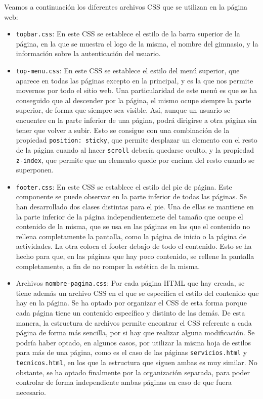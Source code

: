 \documentclass[11pt]{article}
\theoremstyle{plain}
\theoremstyle{definition}
\begin{document}
Veamos a continuación los diferentes archivos CSS que se utilizan en
la página web:

\begin{itemize}
\item \texttt{topbar.css}: En este CSS se establece el estilo de la
  barra superior de la página, en la que se muestra el logo de la
  misma, el nombre del gimnasio, y la información sobre la
  autenticación del usuario.
\item \texttt{top-menu.css}: En este CSS se establece el estilo del
  menú superior, que aparece en todas las páginas excepto en la
  principal, y es la que nos permite movernos por todo el sitio
  web. Una particularidad de este menú es que se ha conseguido que al
  descender por la página, el mismo ocupe siempre la parte superior,
  de forma que siempre sea visible.  Así, aunque un usuario se
  encuentre en la parte inferior de una página, podrá dirigirse a otra
  página sin tener que volver a subir. Esto se consigue con una
  combinación de la propiedad \texttt{position: sticky}, que permite
  desplazar un elemento con el resto de la página cuando al hacer
  \texttt{scroll} debería quedarse oculto, y la propiedad
  \texttt{z-index}, que permite que un elemento quede por encima del
  resto cuando se superponen.
\item \texttt{footer.css}: En este CSS se establece el estilo del pie
  de página. Este componente se puede observar en la parte inferior de
  todas las páginas. Se han desarrollado dos clases distintas para el
  pie. Una de ellas se mantiene en la parte inferior de la página
  independientemete del tamaño que ocupe el contenido de la misma, que
  se usa en las páginas en las que el contenido no rellena
  completamente la pantalla, como la página de inicio o la página de
  actividades. La otra coloca el footer debajo de todo el
  contenido. Esto se ha hecho para que, en las páginas que hay poco
  contenido, se rellene la pantalla completamente, a fin de no romper
  la estética de la misma.
\item Archivos \texttt{nombre-pagina.css}: Por cada página HTML que
  hay creada, se tiene además un archivo CSS en el que se especifica
  el estilo del contenido que hay en la página. Se ha optado por
  organizar el CSS de esta forma porque cada página tiene un contenido
  específico y distinto de las demás. De esta manera, la estructura de
  archivos permite encontrar el CSS referente a cada página de forma
  más sencilla, por si hay que realizar alguna modificación. Se podría
  haber optado, en algunos casos, por utilizar la misma hoja de
  estilos para más de una página, como es el caso de las páginas
  \texttt{servicios.html} y \texttt{tecnicos.html}, en los que la
  estructura que siguen ambas es muy similar. No obstante, se ha optado
  finalmente por la organización separada, para poder controlar de
  forma independiente ambas páginas en caso de que fuera necesario.
\end{itemize}
\end{document}
